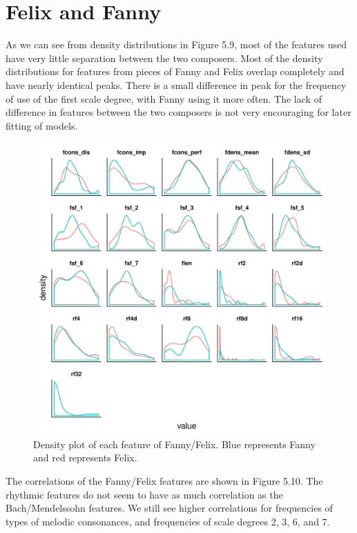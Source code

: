 \documentclass[12pt,twoside]{reedthesis}
\theoremstyle{definition}
\theoremstyle{definition}
\theoremstyle{definition}
\theoremstyle{remark}
\begin{document}
\section{Felix and Fanny}\label{felix-and-fanny}

As we can see from density distributions in Figure 5.9, most of the
features used have very little separation between the two composers.
Most of the density distributions for features from pieces of Fanny and
Felix overlap completely and have nearly identical peaks. There is a
small difference in peak for the frequency of use of the first scale
degree, with Fanny using it more often. The lack of difference in
features between the two composers is not very encouraging for later
fitting of models.
\begin{figure}[H]
\centering
\includegraphics[scale = .7]{images/distribution_f.pdf}
\caption{Density plot of each feature of Fanny/Felix. Blue represents Fanny and red represents Felix.}
\label{subd}
\end{figure}
The correlations of the Fanny/Felix features are shown in Figure 5.10.
The rhythmic features do not seem to have as much correlation as the
Bach/Mendelssohn features. We still see higher correlations for
frequencies of types of melodic consonances, and frequencies of scale
degrees 2, 3, 6, and 7.
\end{document}

